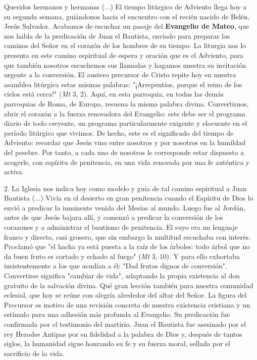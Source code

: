 Queridos hermanos y hermanas (...) El tiempo litúrgico de Adviento llega
hoy a su segunda semana, guiándonos hacia el encuentro con el recién
nacido de Belén, Jesús Salvador. Acabamos de escuchar un pasaje del
\textbf{Evangelio de Mateo}, que nos habla de la predicación de Juan el
Bautista, enviado para preparar los caminos del Señor en el corazón de
los hombres de su tiempo. La liturgia nos lo presenta en este camino
espiritual de espera y oración que es el Adviento, para que también
nosotros escuchemos sus llamadas y hagamos nuestra su invitación urgente
a la conversión. El austero precursor de Cristo repite hoy en nuestra
asamblea litúrgica estas mismas palabras: "¡Arrepentíos, porque el reino
de los cielos está cerca!" (\emph{Mt} 3, 2). Aquí, en esta parroquia, en
todas las demás parroquias de Roma, de Europa, resuena la misma palabra
divina. Convertirnos, abrir el corazón a la fuerza renovadora del
Evangelio: este debe ser el programa diario de todo creyente, un
programa particularmente exigente y elocuente en el período litúrgico
que vivimos. De hecho, este es el significado del tiempo de Adviento:
recordar que Jesús vino entre nosotros y por nosotros en la humildad del
pesebre. Por tanto, a cada uno de nosotros le corresponde estar
dispuesto a acogerle, con espíritu de penitencia, en una vida renovada
por una fe auténtica y activa.

2. La Iglesia nos indica hoy como modelo y guía de tal camino espiritual
a Juan Bautista (...) Vivía en el desierto en gran penitencia cuando el
Espíritu de Dios lo envió a predicar la inminente venida del Mesías al
mundo. Luego fue al Jordán, antes de que Jesús bajara allí, y comenzó a
predicar la conversión de los corazones y a administrar el bautismo de
penitencia. El suyo era un lenguaje franco y directo, casi grosero, que
sin embargo la multitud escuchaba con interés. Proclamó que "el hacha ya
está puesta a la raíz de los árboles: todo árbol que no da buen fruto es
cortado y echado al fuego" (\emph{Mt} 3, 10). Y para ello exhortaba
insistentemente a los que acudían a él: "Dad frutos dignos de
conversión". Convertirse significa "cambiar de vida", adaptando la
propia existencia al don gratuito de la salvación divina. Qué gran
lección también para nuestra comunidad eclesial, que hoy se reúne con
alegría alrededor del altar del Señor. La figura del Precursor es motivo
de una revisión concreta de nuestra existencia cristiana y un estímulo
para una adhesión más profunda al Evangelio. Su predicación fue
confirmada por el testimonio del martirio. Juan el Bautista fue
asesinado por el rey Herodes Antipas por su fidelidad a la palabra de
Dios y, después de tantos siglos, la humanidad sigue honrando su fe y su
fuerza moral, sellada por el sacrificio de la vida.

